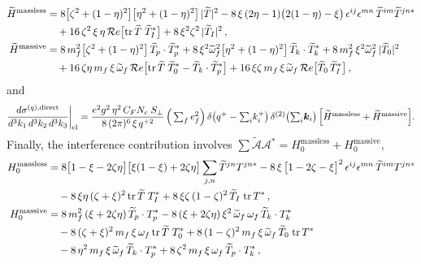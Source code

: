 \documentclass[11pt,a4paper]{article}
\newcommand{\Spe}{S_{\perp}}
\newcommand{\vk}{\bm{k}}
\numberwithin{equation}{section}
\begin{document}
\begin{align}
\label{eq:Hmomq}
\widetilde H^{\text{massless}} & = 8\big[\zeta^{2}+(1-\eta)^{2}\big]
\big[\eta^{2}+(1-\eta)^{2}\big]\,|\widetilde T|^{2}
-8\,\xi\,(2\eta-1)\big(2(1-\eta)-\xi\big)\,
\epsilon^{ij}\epsilon^{mn}\,\widetilde T^{im}\widetilde T^{jn*} \notag\\
&\quad +16\,\zeta^{2}\,\xi\,\eta\,{\mathcal Re}\big[{\rm tr}\,\widetilde T\;
\widetilde T^{*}_{I}\big]+8\,\xi^{2}\zeta^{2}\,|\widetilde T_{I}|^{2}\,,\notag \\
\widetilde H^{\text{massive}} & = 8\,m^{2}_{f}\big[\zeta^{2}+(1-\eta)^{2}\big]\,
\widetilde T_{p}\cdot\widetilde T^{*}_{p}
+8\,\xi^{2}\widetilde\omega^{2}_{f}\big[\eta^{2}+(1-\eta)^{2}\big]\,
\widetilde T_{k}\cdot\widetilde T^{*}_{k}
+8\,m^{2}_{f}\,\xi^{2}\widetilde\omega^{2}_{f}\,|\widetilde T_{0}|^{2} \notag\\
&\quad +16\,\zeta\eta\,m_{f}\,\xi\,\widetilde\omega_{f}\,
{\mathcal Re}\big[{\rm tr}\,\widetilde T\;\widetilde T^{*}_{0}
-\widetilde T_{k}\cdot\widetilde T^{*}_{p}\big]
+16\,\xi\zeta\,m_{f}\,\xi\,\widetilde\omega_{f}\,
{\mathcal Re}\big[\widetilde T_{0}\,\widetilde T^{*}_{I}\big]\,,
\end{align}
and
\begin{align}
\label{eq:finalq}
\frac{d\sigma^{(q),\rm direct}}{d^{3}k_{1}\,d^{3}k_{2}\,d^{3}k_{3}}\bigg|_{\rm el} =
\frac{e^{2}g^{2}\,\eta^{2}\,C_{F}N_{c}\;\Spe}{8\,(2\pi)^{6}\,\xi\,q^{+2}}\,
\Big(\textstyle\sum_{f}e^{2}_{f}\Big)\,
\delta\big(q^{+}-{\textstyle\sum_i} k^{+}_{i}\big)\,
\delta^{(2)}\big({\textstyle\sum_i}\vk_{i}\big)\,
\Big[\widetilde H^{\text{massless}}+\widetilde H^{\text{massive}}\Big].
\end{align}
Finally, the interference contribution involves
$\sum\widetilde{\mathcal{A}}\mathcal{A}^{*} = H_{0}^{\text{massless}}+H_{0}^{\text{massive}}$,
\begin{align}
\label{eq:Hmomx}
H_{0}^{\text{massless}} & = 8\big[1-\xi-2\zeta\eta\big]\big[\xi(1-\xi)+2\zeta\eta\big]
\sum_{j,n}\widetilde T^{jn}T^{jn*}
-8\,\xi\,\big[1-2\zeta-\xi\big]^{2}\,\epsilon^{ij}\epsilon^{mn}\,
\widetilde T^{im}T^{jn*} \notag\\
&\quad -8\,\xi\eta\,(\zeta+\xi)^{2}\,{\rm tr}\,\widetilde T\;T^{*}_{I}
+8\,\xi\zeta\,(1-\zeta)^{2}\,\widetilde T_{I}\;{\rm tr}\,T^{*}\,,\notag \\
H_{0}^{\text{massive}} & = 8\,m^{2}_{f}\,(\xi+2\zeta\eta)\,\widetilde T_{p}\cdot T^{*}_{p}
-8\,(\xi+2\zeta\eta)\,\xi^{2}\,\widetilde\omega_{f}\,\omega_{f}\,
\widetilde T_{k}\cdot T^{*}_{k} \notag\\
&\quad -8\,(\zeta+\xi)^{2}\,m_{f}\,\xi\,\omega_{f}\,{\rm tr}\,\widetilde T\;T^{*}_{0}
+8\,(1-\zeta)^{2}\,m_{f}\,\xi\,\widetilde\omega_{f}\,\widetilde T_{0}\;{\rm tr}\,T^{*} \notag\\
&\quad -8\,\eta^{2}\,m_{f}\,\xi\,\widetilde\omega_{f}\,\widetilde T_{k}\cdot T^{*}_{p}
+8\,\zeta^{2}\,m_{f}\,\xi\,\omega_{f}\,\widetilde T_{p}\cdot T^{*}_{k}\,,
\end{align}
\end{document}
